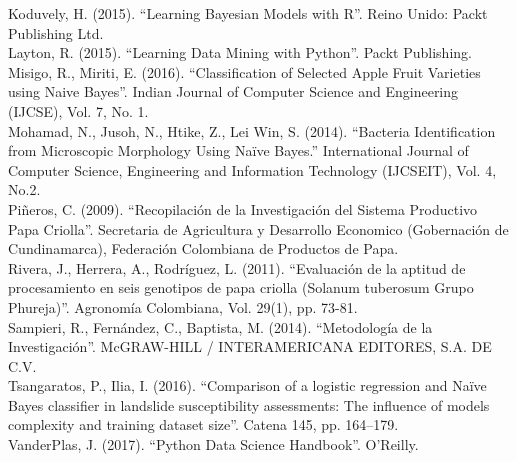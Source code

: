 \noindent
Koduvely, H. (2015). "`Learning Bayesian Models with R"'. Reino Unido: Packt Publishing Ltd.\\

\noindent
Layton, R. (2015). "`Learning Data Mining with Python"'. Packt Publishing.\\

\noindent
Misigo, R., Miriti, E. (2016). "`Classification of Selected Apple Fruit Varieties using Naive Bayes"'. Indian Journal of Computer Science and Engineering (IJCSE), Vol. 7, No. 1.\\

\noindent
Mohamad, N., Jusoh, N., Htike, Z., Lei Win, S. (2014). "`Bacteria Identification from Microscopic Morphology Using Naïve Bayes."' International Journal of Computer Science, Engineering and Information Technology (IJCSEIT), Vol. 4, No.2.\\

\noindent 
Piñeros, C. (2009). "`Recopilación de la Investigación del Sistema Productivo Papa Criolla"'. Secretaria de Agricultura y Desarrollo Economico (Gobernación de Cundinamarca), Federación Colombiana de Productos de Papa.\\

\noindent
Rivera, J., Herrera, A., Rodríguez, L. (2011). "`Evaluación de la aptitud de procesamiento en seis genotipos de papa criolla (Solanum tuberosum Grupo Phureja)"'. Agronomía Colombiana, Vol. 29(1), pp. 73-81.\\

\noindent
Sampieri, R., Fernández, C., Baptista, M. (2014). "`Metodología de la Investigación"'. McGRAW-HILL / INTERAMERICANA EDITORES, S.A. DE C.V.\\

\noindent
Tsangaratos, P., Ilia, I. (2016). "`Comparison of a logistic regression and Naïve Bayes classifier in landslide susceptibility assessments: The influence of models complexity and training dataset size"'. Catena 145, pp. 164–179.\\

\noindent
VanderPlas, J. (2017). "`Python Data Science Handbook"'. O’Reilly.\\


\noindent

\noindent

